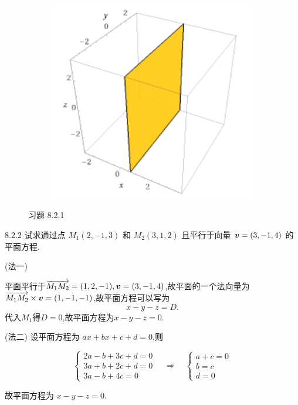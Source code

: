 \begin{solution}
\begin{figure}[htbp]
\begin{subfigure}{0.23\textwidth}
        \centering
        \includegraphics[width=\linewidth]{figure/1-6.png}
      \end{subfigure}
      \caption{习题 8.2.1}
    \end{figure}
\end{solution}

\begin{exercise}{8.2.2}
    试求通过点 $M_1(2, -1, 3)$ 和 $M_2(3, 1, 2)$ 且平行于向量 $\bm{v} = (3, -1, 4)$ 的平面方程.

\end{exercise}

\begin{solution}
    (法一)

    平面平行于$\overrightarrow{M_1M_2} = (1, 2, -1), \bm{v} = (3, -1, 4)$,故平面的一个法向量为$\overrightarrow{M_1M_2} \times \bm{v} = (1,-1,-1)$,故平面方程可以写为
    $$
    x - y - z = D.
    $$
    代入$M_1$得$D = 0$,故平面方程为$x - y - z = 0$.

    (法二)
    设平面方程为 $ ax + bx + c + d = 0 $,则

\[
\left\{
\begin{aligned}
2a - b + 3c + d = 0 \\
3a + b + 2c + d = 0 \\
3a - b + 4c = 0
\end{aligned}
\right.
\quad \Rightarrow \quad
\left\{
\begin{aligned}
a + c = 0 \\
b = c \\
d = 0
\end{aligned}
\right.
\]

故平面方程为 $x - y - z = 0$.

\end{solution}

